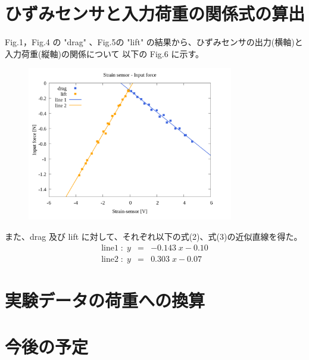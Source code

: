 \documentclass[twocolumn,a4j]{jsarticle}
\begin{document}
\section{ひずみセンサと入力荷重の関係式の算出}
Fig.1，Fig.4 の "drag" 、Fig.5の "lift" の結果から、ひずみセンサの出力(横軸)と入力荷重(縦軸)の関係について
以下の Fig.6 に示す。
\begin{figure}[htbp]
    \footnotesize
    \begin{center}
        \includegraphics[width=90mm]{images/08_strainsensor-forces&line.png}
        \caption{}
    \end{center}
\end{figure}

また、drag 及び lift に対して、それぞれ以下の式(2)、式(3)の近似直線を得た。
\begin{eqnarray}
    \mathrm{line 1} \; : \; y &=& -0.143 \; x - 0.10\\
    \mathrm{line 2} \; : \; y &=& 0.303 \; x - 0.07
\end{eqnarray}

\section{実験データの荷重への換算}



\section{今後の予定}
\end{document}
